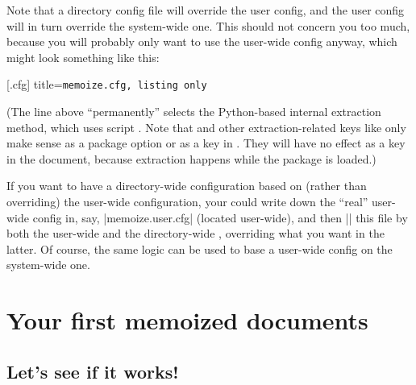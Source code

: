 \documentclass[a4paper,11pt]{article}
\begin{document}
Note that a directory config file will override the user config, and the user
config will in turn override the system-wide one.  This should not concern you
too much, because you will probably only want to use the user-wide config
anyway, which might look something like this:

[.cfg]{
  title=\tt memoize.cfg,
  listing only
}

(The  line above ``permanently'' selects the Python-based
internal extraction method, which uses script .
Note that  and other extraction-related keys like  only make sense as a package option or as a
 key in .  They will have no effect as a
 key in the document, because extraction happens while the
package is loaded.)

If you want to have a directory-wide configuration based on (rather than
overriding) the user-wide configuration, your could write down the ``real''
user-wide config in, say, |memoize.user.cfg| (located user-wide), and then
|| this file by both the user-wide and the directory-wide
, overriding what you want in the latter.  Of course, the
same logic can be used to base a user-wide config on the system-wide one.

\section{Your first memoized documents}
\label{sec:tut}

\subsection{Let's see if it works!}
\label{sec:tut:test}

%
\end{document}
